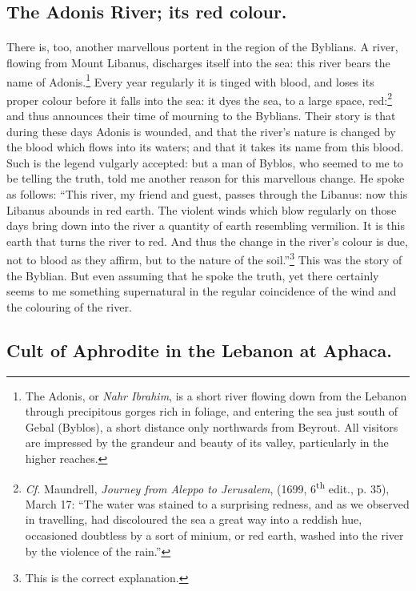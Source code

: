\documentclass[a4paper, 11pt, oneside, polutonikogreek, english]{article}
\begin{document}
\subsection{The Adonis River; its red colour.}
\paragraph{}
There is, too, another marvellous portent in the region of the Byblians. A river, flowing from Mount Libanus, discharges itself into the sea: this river bears the name of Adonis.\footnote{The Adonis, or \emph{Nahr Ibrahim}, is a short river flowing down from the Lebanon through precipitous gorges rich in foliage, and entering the sea just south of Gebal (Byblos), a short distance only northwards from Beyrout. All visitors are impressed by the grandeur and beauty of its valley, particularly in the higher reaches.} Every year regularly it is tinged with blood, and loses its proper colour before it falls into the sea: it dyes the sea, to a large space, red:\footnote{\emph{Cf.} Maundrell, \emph{Journey from Aleppo to Jerusalem}, (1699, 6\textsuperscript{th} edit., p. 35), March 17: ``The water was stained to a surprising redness, and as we observed in travelling, had discoloured the sea a great way into a reddish hue, occasioned doubtless by a sort of minium, or red earth, washed into the river by the violence of the rain.''} and thus announces their time of mourning to the Byblians. Their story is that during these days Adonis is wounded, and that the river's nature is changed by the blood which flows into its waters; and that it takes its name from this blood. Such is the legend vulgarly accepted: but a man of Byblos, who seemed to me to be telling the truth, told me another reason for this marvellous change. He spoke as follows: ``This river, my friend and guest, passes through the Libanus: now this Libanus abounds in red earth. The violent winds which blow regularly on those days bring down into the river a quantity of earth resembling vermilion. It is this earth that turns the river to red. And thus the change in the river's colour is due, not to blood as they affirm, but to the nature of the soil.''\footnote{This is the correct explanation.} This was the story of the Byblian. But even assuming that he spoke the truth, yet there certainly seems to me something supernatural in the regular coincidence of the wind and the colouring of the river.

\subsection{Cult of Aphrodite in the Lebanon at Aphaca.}
\end{document}
